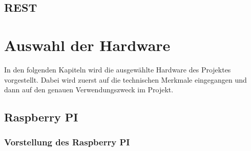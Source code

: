 \documentclass[ngerman]{scrartcl} %
\begin{document}
\subsection{REST}        
\label{sec:REST-1}  

\cite{Tilkov.2015}
 
 
\newpage
 
\section{Auswahl der Hardware}        
\label{sec:Auswahl der Hardware-1}  

In den folgenden Kapiteln wird die ausgewählte Hardware des Projektes vorgestellt. Dabei wird zuerst auf die technischen Merkmale eingegangen und dann auf den genauen Verwendungszweck im Projekt. 

\subsection{Raspberry PI}        
\label{sec:Raspberry PI-1} 

\subsubsection{Vorstellung des Raspberry PI}        
\label{sec:Vorstellung des Raspberry PI-1} 
\end{document}
